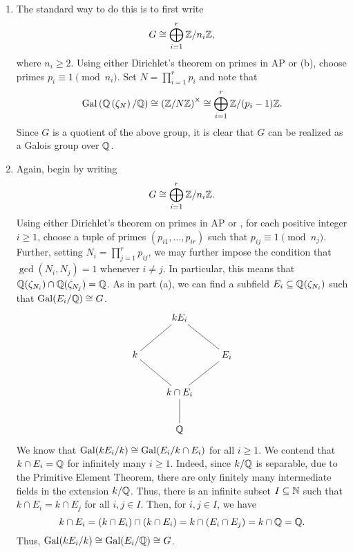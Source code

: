 \begin{exercise}
\begin{enumerate}[label=(\alph*)]
\item The standard way to do this is to first write 
\begin{equation*}
    G\cong\bigoplus_{i = 1}^r \mathbb{Z}/n_i\mathbb{Z},
\end{equation*}
where $n_i\ge 2$. Using either Dirichlet's theorem on primes in AP or (b), choose primes $p_i\equiv 1\pmod{n_i}$. Set $\displaystyle N = \prod_{i = 1}^{r}p_i$ and note that 
\begin{equation*}
    \operatorname{Gal}\left(\mathbb{Q}\left(\zeta_N\right)/\mathbb{Q}\right)\cong\left(\mathbb{Z}/N\mathbb{Z}\right)^\times\cong\bigoplus_{i = 1}^r \mathbb{Z}/(p_i - 1)\mathbb{Z}.
\end{equation*}
Since $G$ is a quotient of the above group, it is clear that $G$ can be realized as a Galois group over $\mathbb{Q}$.

\item Again, begin by writing 
\begin{equation*}
    G\cong\bigoplus_{i = 1}^r \mathbb{Z}/n_i\mathbb{Z}.
\end{equation*}
Using either Dirichlet's theorem on primes in AP or , for each positive integer $i\ge 1$, choose a tuple of primes $(p_{i1},\dots,p_{ir})$ such that $p_{ij}\equiv 1\pmod{n_j}$. Further, setting $N_i = \displaystyle\prod_{j = 1}^r p_{ij}$, we may further impose the condition that $\gcd(N_i, N_j) = 1$ whenever $i\ne j$. In particular, this means that $\mathbb{Q}(\zeta_{N_i})\cap\mathbb{Q}(\zeta_{N_j}) = \mathbb{Q}$. As in part (a), we can find a subfield $E_i\subseteq\mathbb{Q}(\zeta_{N_i})$ such that $\operatorname{Gal}(E_i/\mathbb{Q})\cong G$.
\begin{equation*}
    \xymatrix {
        & kE_i & \\
        k\ar@{-}[ru] & & E_i\ar@{-}[lu]\\
        & k\cap E_i\ar@{-}[lu]\ar@{-}[ru] & \\
            & \Q\ar@{-}[u] & 
    }
\end{equation*}
We know that $\operatorname{Gal}(kE_i/k)\cong\operatorname{Gal}(E_i/k\cap E_i)$ for all $i\ge 1$. We contend that $k\cap E_i = \mathbb{Q}$ for infinitely many $i\ge 1$. Indeed, since $k/\mathbb{Q}$ is separable, due to the Primitive Element Theorem, there are only finitely many intermediate fields in the extension $k/\mathbb{Q}$. Thus, there is an infinite subset $I\subseteq\mathbb{N}$ such that $k\cap E_i = k\cap E_j$ for all $i,j\in I$. Then, for $i,j\in I$, we have 
\begin{equation*}
    k\cap E_i = (k\cap E_i)\cap(k\cap E_i) = k\cap (E_i\cap E_j) = k\cap\mathbb{Q} = \mathbb{Q}.
\end{equation*}
Thus, $\operatorname{Gal}(kE_i/k)\cong\operatorname{Gal}(E_i/\mathbb{Q})\cong G$.


\end{enumerate}
\end{exercise}
